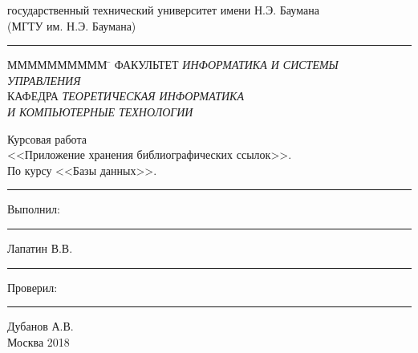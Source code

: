 \begin{titlepage}	%

\begin{center}	
 государственный технический университет имени Н.Э. Баумана\\
\large {(МГТУ им. Н.Э. Баумана)}\\[0.4cm] 
\rule[+3mm]{7.5cm}{0.80mm}
\begin{flushleft}
\begin{tabbing}
ММММММММММ \= \kill
\large{ФАКУЛЬТЕТ} \> \large{\textit{ИНФОРМАТИКА И СИСТЕМЫ УПРАВЛЕНИЯ}} \\	\large{КАФЕДРА} \> \large{\textit{ТЕОРЕТИЧЕСКАЯ ИНФОРМАТИКА}} \\
 \> \large{\textit{И КОМПЬЮТЕРНЫЕ ТЕХНОЛОГИИ}}
\\[1.0cm]
\end{tabbing}
\end{flushleft}
\end{center}


\begin{center}


\Huge{Курсовая работа}\\
\LARGE{<<Приложение хранения библиографических ссылок>>.}
\\[0.5cm]
\LARGE{По курсу <<Базы данных>>.}
\\[2.0cm]




 \rule[+0mm]{6.2cm}{0.0mm}Выполнил:  \rule[+0mm]{1.3cm}{0.0mm} Лапатин В.В.\\
 \rule[+0mm]{6.2cm}{0.0mm}Проверил:  \rule[+0mm]{1.1cm}{0.0mm} Дубанов А.В.\\ [3.5cm]



\large{Москва 2018}
\end{center}
\thispagestyle{empty} %
\end{titlepage} %